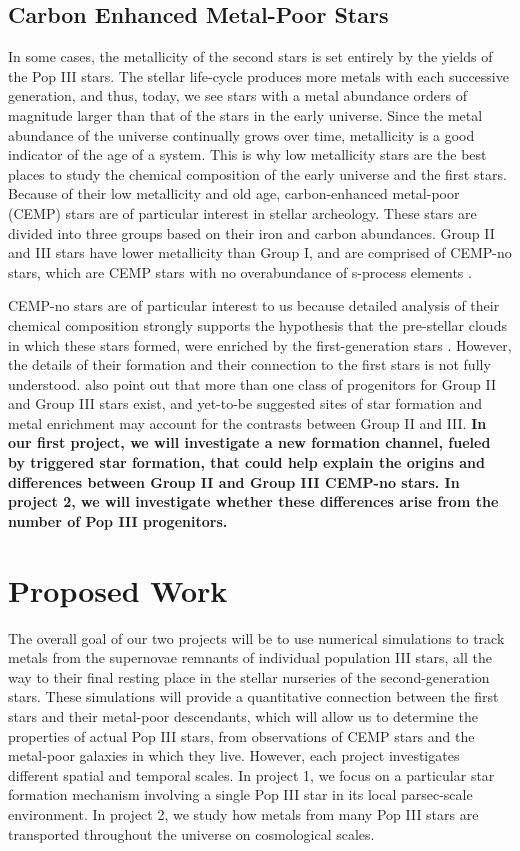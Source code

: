 \documentclass[letterpaper, 12pt]{article}
\begin{document}
\subsection*{Carbon Enhanced Metal-Poor Stars}

In some cases, the metallicity of the second stars is set entirely by the yields of the Pop III stars. The stellar life-cycle produces more metals with each successive generation, and thus, today, we see stars with a metal abundance orders of magnitude larger than that of the stars in the early universe. Since the metal abundance of the universe continually grows over time, metallicity is a good indicator of the age of a system. This is why low metallicity stars are the best places to study the chemical composition of the early universe and the first stars. Because of their low metallicity and old age, carbon-enhanced metal-poor (CEMP) stars are of particular interest in stellar archeology. These stars are divided into three groups based on their iron and carbon abundances. Group II and III stars have lower metallicity than Group I, and are comprised of CEMP-no stars, which are CEMP stars with no overabundance of s-process elements \citep{Maeder2015}. 

CEMP-no stars are of particular interest to us because detailed analysis of their chemical composition strongly supports the hypothesis that the pre-stellar clouds in which these stars formed, were enriched by the first-generation stars \citep{Yoon2016}. However, the details of their formation and their connection to the first stars is not fully understood. \cite{Yoon2016} also point out that more than one class of progenitors for Group II and Group III stars exist, and yet-to-be suggested sites of star formation and metal enrichment may account for the contrasts between Group II and III. \textbf{In our first project, we will investigate a new formation channel, fueled by triggered star formation, that could help explain the origins and differences between Group II and Group III CEMP-no stars. In project 2, we will investigate whether these differences arise from the number of Pop III progenitors.}


\section{Proposed Work}
The overall goal of our two projects will be to use numerical simulations to track metals from the supernovae remnants of individual population III stars, all the way to their final resting place in the stellar nurseries of the second-generation stars. These simulations will provide a quantitative connection between the first stars and their metal-poor descendants, which will allow us to determine the properties of actual Pop III stars, from observations of CEMP stars and the metal-poor galaxies in which they live. However, each project investigates different spatial and temporal scales. In project 1, we focus on a particular star formation mechanism involving a single Pop III star in its local parsec-scale environment. In project 2, we study how metals from many Pop III stars are transported throughout the universe on cosmological scales. 
\end{document}
